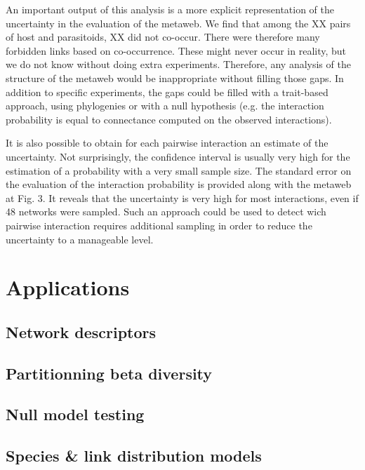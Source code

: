 \documentclass[12pt]{article}
\begin{document}
An important output of this analysis is a more explicit representation of the
uncertainty in the evaluation of the metaweb. We find that among the XX pairs of
host and parasitoids, XX did not co-occur. There were therefore many forbidden
links based on co-occurrence. These might never occur in reality, but we do not
know without doing extra experiments. Therefore, any analysis of the structure
of the metaweb would be inappropriate without filling those gaps. In addition to
specific experiments, the gaps could be filled with a trait-based approach,
using phylogenies or with a null hypothesis (e.g. the interaction probability is
equal to connectance computed on the observed interactions).

It is also possible to obtain for each pairwise interaction an estimate of the
uncertainty. Not surprisingly, the confidence interval is usually very high for
the estimation of a probability with a very small sample size. The standard
error on the evaluation of the interaction probability is provided along with
the metaweb at Fig. 3. It reveals that the uncertainty is very high for most
interactions, even if 48 networks were sampled. Such an approach could be used
to detect wich pairwise interaction requires additional sampling in order to
reduce the uncertainty to a manageable level.
  
\newpage
\section*{Applications}

\subsection*{Network descriptors}

\subsection*{Partitionning beta diversity}

\subsection*{Null model testing}

\subsection*{Species \& link distribution models}
\end{document}
